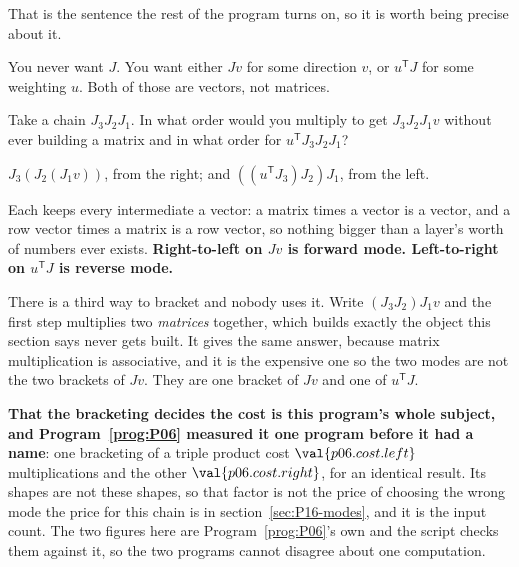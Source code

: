 \begin{fr}
That is the sentence the rest of the program turns on, so it is worth being
precise about it.

You never want $J$. You want either $Jv$ for some direction $v$, or $u^{\mathsf{T}}J$
for some weighting $u$. Both of those are vectors, not matrices.

Take a chain $J_3 J_2 J_1$. In what order would you multiply to get
$J_3 J_2 J_1 v$ without ever building a matrix \dash{} and in what order for
$u^{\mathsf{T}} J_3 J_2 J_1$?
\dotline
\nextframe
\end{fr}

\begin{fr}
\begin{ansblock}
$J_3(J_2(J_1 v))$, from the right; and $((u^{\mathsf{T}}J_3)J_2)J_1$, from the
left.
\end{ansblock}

Each keeps every intermediate a vector: a matrix times a vector is a vector,
and a row vector times a matrix is a row vector, so nothing bigger than a
layer's worth of numbers ever exists. \textbf{Right-to-left on $Jv$ is forward
mode. Left-to-right on $u^{\mathsf{T}}J$ is reverse mode.}

There is a third way to bracket and nobody uses it. Write $(J_3 J_2) J_1 v$
and the first step multiplies two \emph{matrices} together, which builds
exactly the object this section says never gets built. It gives the same
answer, because matrix multiplication is associative, and it is the expensive
one \dash{} so the two modes are not the two brackets of $Jv$. They are one
bracket of $Jv$ and one of $u^{\mathsf{T}}J$.

\textbf{That the bracketing decides the cost is this program's whole subject,
and Program~\ref{prog:P06} measured it one program before it had a name}: one
bracketing of a triple product cost $\val{p06.cost.left}$ multiplications and
the other $\val{p06.cost.right}$, for an identical result. Its shapes are not
these shapes, so that factor is not the price of choosing the wrong mode
\dash{} the price for this chain is in section~\ref{sec:P16-modes}, and it is
the input count. The two figures here are Program~\ref{prog:P06}'s own and the
script checks them against it, so the two programs cannot disagree about one
computation.

\end{fr}

